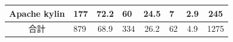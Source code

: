 \documentclass{fose2019}           %
\begin{document}
\begin{table}[]
\begin{tabular}{|c|p{2.5em}|c|p{4em}|c|p{3.5em}|c|c|c|}
{\scriptsize Apache kylin}             & {\scriptsize \hfil 177 \hfil}                & {\scriptsize 72.2}                &{\scriptsize \hfil 60 \hfil}                       & {\scriptsize 24.5}                     & {\scriptsize \hfil 7 \hfil}                      & {\scriptsize 2.9}                    & \multicolumn{2}{c|}{\scriptsize 245}  \\ \hline
{\scriptsize 合計}                      & {\scriptsize \hfil 879 \hfil}                & {\scriptsize 68.9}                & {\scriptsize \hfil 334 \hfil}                      & {\scriptsize 26.2}                     & {\scriptsize \hfil 62 \hfil}                     & {\scriptsize 4.9}                    & \multicolumn{2}{c|}{\scriptsize 1275} \\ \hline
\end{tabular}
\end{table}

\end{document}
